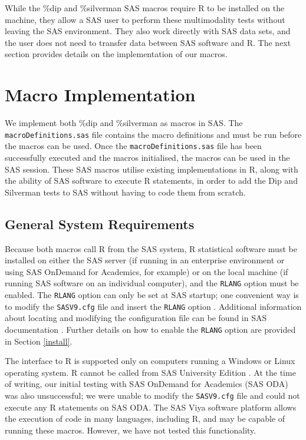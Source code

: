 \documentclass[]{interact}
\theoremstyle{plain}%
\theoremstyle{definition}
\theoremstyle{remark}
\begin{document}
While the \%dip and \%silverman SAS macros require R to be installed on the machine, they allow a SAS user to perform these multimodality tests without leaving the SAS environment. They also work directly with SAS data sets, and the user does not need to transfer data between SAS software and R. The next section provides details on the implementation of our macros.

\section{Macro Implementation}
We implement both \%dip and \%silverman as macros in SAS. The \texttt{macroDefinitions.sas} file contains the macro definitions and must be run before the macros can be used. Once the \texttt{macroDefinitions.sas} file has been successfully executed and the macros initialised, the macros can be used in the SAS session. These SAS macros utilise existing implementations in R, along with the ability of SAS software to execute R statements, in order to add the Dip and Silverman tests to SAS without having to code them from scratch.

\subsection{General System Requirements}
Because both macros call R from the SAS system, %
R statistical software must be installed on either the SAS server (if running in an enterprise environment or using SAS OnDemand for Academics, for example) or on the local machine (if running SAS software on an individual computer), and the \texttt{RLANG} option must be enabled. The \texttt{RLANG} option can only be set at SAS startup; one convenient way is to modify the \texttt{SASV9.cfg} file and insert the \texttt{RLANG} option \citep[p.~241]{SAS-rlang}. Additional information about locating and modifying the configuration file can be found in SAS documentation \citep[p.~12]{SAS-config}. Further details on how to enable the \texttt{RLANG} option are provided in Section \ref{install}. 

The interface to R is supported only on computers running a Windows or Linux operating system. R cannot be called from SAS University Edition \citep[p.~240]{SAS-rlang}. At the time of writing, our initial testing with SAS OnDemand for Academics (SAS ODA) was also unsuccessful; we were unable to modify the \texttt{SASV9.cfg} file and could not execute any R statements on SAS ODA. The SAS Viya software platform allows the execution of code in many languages, including R, and may be capable of running these macros. However, we have not tested this functionality.
\end{document}

